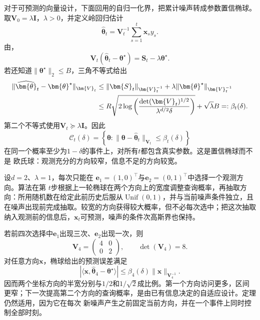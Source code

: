 对于可预测的向量设计，下面回用的自归一化界，把累计噪声转成参数置信椭球。
取$\bm{V}_0=\lambda\bm{I}$，$\lambda>0$，并定义岭回归估计
\begin{equation}
  \widehat{\bm{\theta}}_t
  =\bm{V}_t^{-1}\sum_{s=1}^{t}\bm{x}_s y_s.
  \label{eq:stoch-ridge-estimator}
\end{equation}
由，
\[
  \bm{V}_t
  (\widehat{\bm{\theta}}_t-\bm{\theta}^{\star})
  =
  \bm{S}_t-\lambda\bm{\theta}^{\star}.
  \]
若还知道$\lVert\bm{\theta}^{\star}\rVert_2\leq B$，三角不等式给出
\begin{align}
  \lVert
    \widehat{\bm{\theta}}_t-\bm{\theta}^{\star}
  \rVert_{\bm{V}_t}
  &\leq
  \lVert\bm{S}_t\rVert_{\bm{V}_t^{-1}}
  +
  \lambda
  \lVert\bm{\theta}^{\star}\rVert_{\bm{V}_t^{-1}}
  \notag\\
  &\leq
  R\sqrt{
    2\log\left(
      \frac{\det(\bm{V}_t)^{1/2}}
           {\lambda^{d/2}\delta}
    \right)
  }
  +\sqrt{\lambda}B
  =:\beta_t(\delta).
  \label{eq:stoch-adaptive-confidence-ellipsoid}
\end{align}
第二个不等式使用$\bm{V}_t\succeq\lambda\bm{I}$。因此
\[
  \mathcal{C}_t(\delta)
  =
  \left\{
    \bm{\theta}:
    \lVert\bm{\theta}-\widehat{\bm{\theta}}_t
    \rVert_{\bm{V}_t}
    \leq\beta_t(\delta)
  \right\}
\]
在同一个概率至少为$1-\delta$的事件上，对所有$t$都包含真实参数。这是置信椭球而不是
欧氏球：观测充分的方向较窄，信息不足的方向较宽。

\begin{example}[二维自适应查询]
  \label{ex:stoch-two-dimensional-adaptive-design}
  设$d=2$、$\lambda=1$，每次只能在
  $\bm{e}_1=(1,0)^\top$与$\bm{e}_2=(0,1)^\top$中选择一个观测方向。算法在第
  $t$步根据上一轮椭球在两个方向上的宽度调整查询概率，再抽取方向：所用随机数在给定此前历史后服从\(\operatorname{Unif}(0,1)\)，并与当前噪声条件独立，且在噪声出现前完成抽取。较宽的方向获得较大概率，但不必每次选中；把这次抽取纳入观测前的信息后，$\bm{x}_t$可预测，噪声的条件次高斯界也保持。

  若前四次选择中$\bm{e}_1$出现三次、$\bm{e}_2$出现一次，则
  \[
    \bm{V}_4
    =
    \begin{pmatrix}
      4&0\\
      0&2
    \end{pmatrix},
    \qquad
    \det(\bm{V}_4)=8.
  \]
  对任意方向$\bm{x}$，椭球给出的预测误差满足
  \[
    |\langle
      \bm{x},
      \widehat{\bm{\theta}}_4-\bm{\theta}^{\star}
    \rangle|
    \leq
    \beta_4(\delta)
    \lVert\bm{x}\rVert_{\bm{V}_4^{-1}}.
  \]
  因而两个坐标方向的半宽分别与$1/2$和$1/\sqrt2$成比例。第一个方向访问更多，区间
  更窄；下一次提高第二个方向的查询概率，是由已有信息决定的自适应设计。定理仍然适用，因为它在每次
  新噪声产生之前固定当前方向，并在一个事件上同时控制全部时刻。
\end{example}

